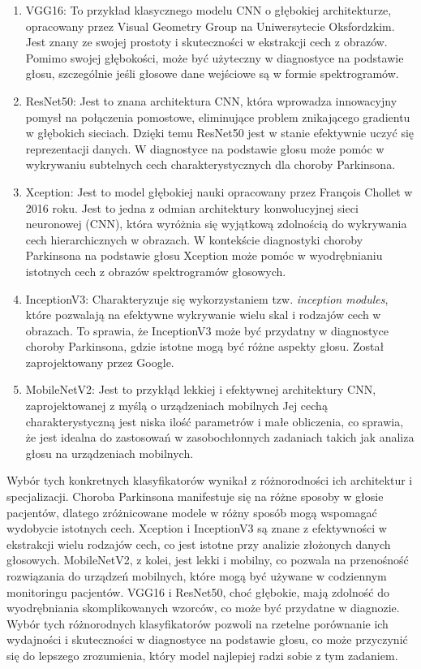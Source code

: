 \begin{enumerate}[label={\alph*)}]
    \item VGG16: To przykład klasycznego modelu CNN o głębokiej architekturze, opracowany przez Visual Geometry Group na Uniwersytecie Oksfordzkim.
    Jest znany ze swojej prostoty i skuteczności w ekstrakcji cech z obrazów.
    Pomimo swojej głębokości, może być użyteczny w diagnostyce na podstawie głosu, szczególnie jeśli głosowe dane wejściowe są w formie spektrogramów.

    \item ResNet50: Jest to znana architektura CNN, która wprowadza innowacyjny pomysł na połączenia pomostowe, eliminujące problem znikającego gradientu w głębokich sieciach.
    Dzięki temu ResNet50 jest w stanie efektywnie uczyć się reprezentacji danych.
    W diagnostyce na podstawie głosu może pomóc w wykrywaniu subtelnych cech charakterystycznych dla choroby Parkinsona.

    \item Xception: Jest to model głębokiej nauki opracowany przez François Chollet w 2016 roku.
    Jest to jedna z odmian architektury konwolucyjnej sieci neuronowej (CNN), która wyróżnia się wyjątkową zdolnością do wykrywania cech hierarchicznych w obrazach.
    W kontekście diagnostyki choroby Parkinsona na podstawie głosu Xception może pomóc w wyodrębnianiu istotnych cech z obrazów spektrogramów głosowych.

    \item InceptionV3: Charakteryzuje się wykorzystaniem tzw. \emph{inception modules}, które pozwalają na efektywne wykrywanie wielu skal i rodzajów cech w obrazach.
    To sprawia, że InceptionV3 może być przydatny w diagnostyce choroby Parkinsona, gdzie istotne mogą być różne aspekty głosu.
    Został zaprojektowany przez Google.

    \item MobileNetV2: Jest to przykłąd lekkiej i efektywnej architektury CNN, zaprojektowanej z myślą o urządzeniach mobilnych
    Jej cechą charakterystyczną jest niska ilość parametrów i małe obliczenia, co sprawia, że jest idealna do zastosowań w zasobochłonnych zadaniach takich jak analiza głosu na urządzeniach mobilnych.

\end{enumerate}

Wybór tych konkretnych klasyfikatorów wynikał z różnorodności ich architektur i specjalizacji.
Choroba Parkinsona manifestuje się na różne sposoby w głosie pacjentów, dlatego zróżnicowane modele w różny sposób mogą wspomagać wydobycie istotnych cech.
Xception i InceptionV3 są znane z efektywności w ekstrakcji wielu rodzajów cech, co jest istotne przy analizie złożonych danych głosowych.
MobileNetV2, z kolei, jest lekki i mobilny, co pozwala na przenośność rozwiązania do urządzeń mobilnych, które mogą być używane w codziennym monitoringu pacjentów.
VGG16 i ResNet50, choć głębokie, mają zdolność do wyodrębniania skomplikowanych wzorców, co może być przydatne w diagnozie.
Wybór tych różnorodnych klasyfikatorów pozwoli na rzetelne porównanie ich wydajności i skuteczności w diagnostyce na podstawie głosu, co może przyczynić się do lepszego zrozumienia, który model najlepiej radzi sobie z tym zadaniem.

